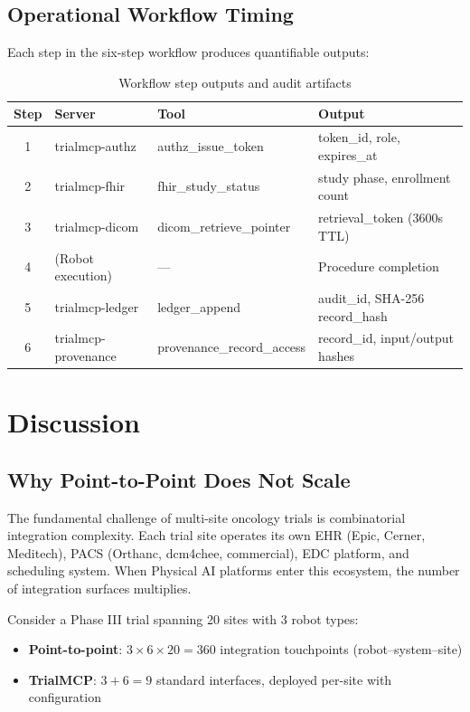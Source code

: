\documentclass[10pt,letterpaper]{article}
\begin{document}
\subsection{Operational Workflow Timing}

Each step in the six-step workflow produces quantifiable outputs:

\begin{table}[H]
\centering
\caption{Workflow step outputs and audit artifacts}
\label{tab:workflow}
\small
\begin{tabularx}{\textwidth}{c l l X}
\toprule
\textbf{Step} & \textbf{Server} & \textbf{Tool} & \textbf{Output} \\
\midrule
1 & trialmcp-authz & authz\_issue\_token & token\_id, role, expires\_at \\
2 & trialmcp-fhir & fhir\_study\_status & study phase, enrollment count \\
3 & trialmcp-dicom & dicom\_retrieve\_pointer & retrieval\_token (3600s TTL) \\
4 & (Robot execution) & --- & Procedure completion \\
5 & trialmcp-ledger & ledger\_append & audit\_id, SHA-256 record\_hash \\
6 & trialmcp-provenance & provenance\_record\_access & record\_id, input/output hashes \\
\bottomrule
\end{tabularx}
\end{table}

\section{Discussion}

\subsection{Why Point-to-Point Does Not Scale}

The fundamental challenge of multi-site oncology trials is combinatorial integration complexity. Each trial site operates its own EHR (Epic, Cerner, Meditech), PACS (Orthanc, dcm4chee, commercial), EDC platform, and scheduling system. When Physical AI platforms enter this ecosystem, the number of integration surfaces multiplies.

Consider a Phase III trial spanning 20 sites with 3 robot types:
\begin{itemize}[leftmargin=2em]
    \item \textbf{Point-to-point}: $3 \times 6 \times 20 = 360$ integration touchpoints (robot--system--site)
    \item \textbf{TrialMCP}: $3 + 6 = 9$ standard interfaces, deployed per-site with configuration
\end{itemize}
\end{document}
